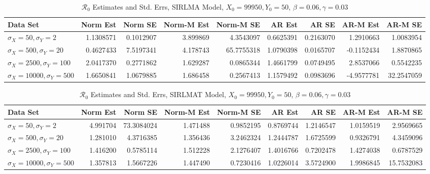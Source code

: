 \documentclass[12pt]{article}
\newcommand{\rr}{\ensuremath{\mathcal{R}_0}}
\begin{document}
\begin{table}[H]
	
	\caption{\label{tab:}$\rr$ Estimates and Std. Errs, SIRLMA Model,
		$X_0 = 99950, Y_0 = 50$, $\beta = 0.06, \gamma = 0.03$}
	\centering
	\begin{footnotesize}
	\begin{tabular}[t]{l|r|r|r|r|r|r|r|r}
		\hline
		Data Set & Norm Est & Norm SE & Norm-M Est & Norm-M SE & AR Est & AR SE & AR-M Est & AR-M SE\\
		\hline
		$\sigma_X = 50, \sigma_Y = 2$ & 1.1308571 & 0.1012907 & 3.899869 & 4.3543097 & 0.6625391 & 0.2163070 & 1.2910663 & 1.0083954\\
		\hline
		$\sigma_X = 500, \sigma_Y = 20$ & 0.4627433 & 7.5197341 & 4.178743 & 65.7755318 & 1.0790398 & 0.0165707 & -0.1152434 & 1.8870865\\
		\hline
		$\sigma_X = 2500, \sigma_Y = 100$ & 2.0417370 & 0.2771862 & 1.629287 & 0.0865344 & 1.4661799 & 0.0749495 & 2.8537066 & 0.5542235\\
		\hline
		$\sigma_X = 10000, \sigma_Y = 500$ & 1.6650841 & 1.0679885 & 1.686458 & 0.2567413 & 1.1579492 & 0.0983696 & -4.9577781 & 32.2547059\\
		\hline
	\end{tabular}
\end{footnotesize}
\end{table}
\begin{table}[H]
	
	\caption{\label{tab:}$\rr$ Estimates and Std. Errs, SIRLMAT Model,
		$X_0 = 99950, Y_0 = 50$, $\beta = 0.06, \gamma = 0.03$}
	\centering
	\begin{footnotesize}
	\begin{tabular}[t]{l|r|r|r|r|r|r|r|r}
		\hline
		Data Set & Norm Est & Norm SE & Norm-M Est & Norm-M SE & AR Est & AR SE & AR-M Est & AR-M SE\\
		\hline
		$\sigma_X = 50, \sigma_Y = 2$ & 4.991704 & 73.3084024 & 1.471488 & 0.9852195 & 0.8769744 & 1.2146547 & 1.0159519 & 2.9569665\\
		\hline
		$\sigma_X = 500, \sigma_Y = 20$ & 1.281010 & 4.3716385 & 1.356436 & 3.2462324 & 1.2444787 & 1.6725599 & 0.9326791 & 4.3459096\\
		\hline
		$\sigma_X = 2500, \sigma_Y = 100$ & 1.416200 & 0.5785114 & 1.512228 & 2.1276407 & 1.4016766 & 0.7202478 & 1.4274038 & 0.6787529\\
		\hline
		$\sigma_X = 10000, \sigma_Y = 500$ & 1.357813 & 1.5667226 & 1.447490 & 0.7230416 & 1.0226014 & 3.5724900 & 1.9986845 & 15.7532083\\
		\hline
	\end{tabular}
\end{footnotesize}
\end{table}
\end{document}
